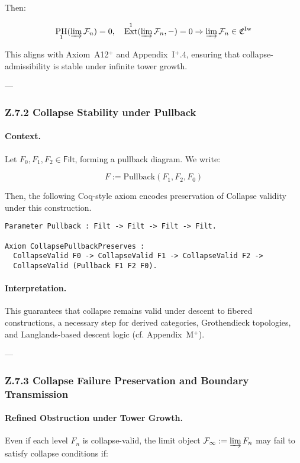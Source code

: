 \documentclass[11pt]{article}
\DeclareMathOperator{\Ext}{Ext}
\DeclareMathOperator{\PH}{PH}
\begin{document}
Then:

\[
\PH_1(\varinjlim \mathcal{F}_n) = 0,\quad \Ext^1(\varinjlim \mathcal{F}_n, -) = 0
\Rightarrow \varinjlim \mathcal{F}_n \in \mathfrak{C}^{\mathrm{Iw}}
\]

This aligns with Axiom~A12$^+$ and Appendix~I$^+$.4, ensuring that collapse-admissibility is stable under infinite tower growth.

---

\subsubsection*{Z.7.2 Collapse Stability under Pullback}

\paragraph{Context.}
Let \( F_0, F_1, F_2 \in \mathsf{Filt} \), forming a pullback diagram. We write:

\[
F := \mathrm{Pullback}(F_1, F_2, F_0)
\]

Then, the following Coq-style axiom encodes preservation of Collapse validity under this construction.

\begin{lstlisting}[language=Coq]
Parameter Pullback : Filt -> Filt -> Filt -> Filt.

Axiom CollapsePullbackPreserves :
  CollapseValid F0 -> CollapseValid F1 -> CollapseValid F2 ->
  CollapseValid (Pullback F1 F2 F0).
\end{lstlisting}

\paragraph{Interpretation.}
This guarantees that collapse remains valid under descent to fibered constructions, a necessary step for derived categories, Grothendieck topologies, and Langlands-based descent logic (cf. Appendix~M$^+$).

---

\subsubsection*{Z.7.3 Collapse Failure Preservation and Boundary Transmission}

\paragraph{Refined Obstruction under Tower Growth.}
Even if each level \( F_n \) is collapse-valid, the limit object \( \mathcal{F}_\infty := \varinjlim F_n \) may fail to satisfy collapse conditions if:
\end{document}
